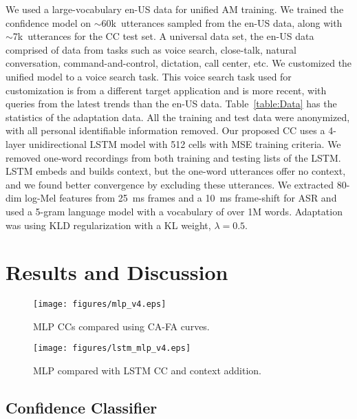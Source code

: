 \documentclass[a4paper]{article}
\begin{document}
We used a large-vocabulary en-US data for unified AM training. We trained the confidence model on $\sim$60k~utterances sampled from the en-US data, along with $\sim$7k~utterances for the CC test set. A universal data set, the en-US data comprised of data from tasks such as voice search, close-talk, natural conversation, command-and-control, dictation,  call center, etc. We customized the unified model to a voice search task. This voice search task used for customization is from a different target application and is more recent, with queries from the latest trends than the en-US data. Table~\ref{table:Data} has the statistics of the adaptation data. All the training and test data were anonymized, with all personal identifiable information removed. Our proposed CC uses a 4-layer unidirectional LSTM model with 512 cells with MSE training criteria. We removed one-word recordings from both training and testing lists of the LSTM. LSTM embeds and builds context, but the one-word utterances offer no context, and we found better convergence by excluding these utterances. We extracted 80-dim log-Mel features from 25~ms frames and a 10~ms frame-shift for ASR and used a 5-gram language model with a vocabulary of over 1M words. Adaptation was using KLD regularization with a KL weight, $\lambda=0.5$.
\section{Results and Discussion}
\label{sec:results}
\begin{figure}[t]
    \centering
    \vspace{-1em}
    \texttt{[image: figures/mlp\_v4.eps]}
    \caption{MLP CCs compared using CA-FA curves.}
    \label{fig:mlp_results}
    \vspace{-1em}
\end{figure}

\begin{figure}[t]
    \centering
    \texttt{[image: figures/lstm\_mlp\_v4.eps]}
    \caption{MLP compared with LSTM CC and context addition.}
    \label{fig:lstm_results}
    \vspace{-2em}
\end{figure}


\subsection{Confidence Classifier}
\end{document}
